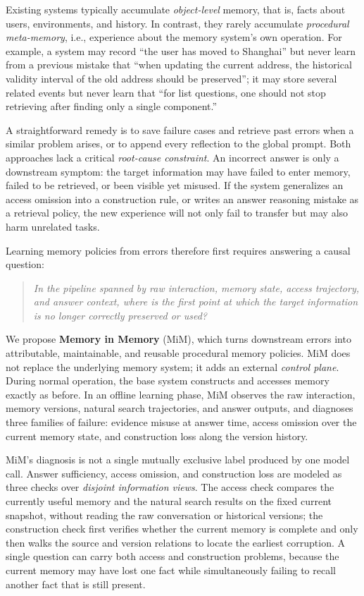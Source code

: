 \documentclass[11pt]{article}
\begin{document}
Existing systems typically accumulate \emph{object-level} memory, that is, facts
about users, environments, and history. In contrast, they rarely accumulate
\emph{procedural meta-memory}, i.e., experience about the memory system's own
operation. For example, a system may record ``the user has moved to Shanghai''
but never learn from a previous mistake that ``when updating the current address,
the historical validity interval of the old address should be preserved''; it
may store several related events but never learn that ``for list questions, one
should not stop retrieving after finding only a single component.''

A straightforward remedy is to save failure cases and retrieve past errors when a
similar problem arises, or to append every reflection to the global prompt.
Both approaches lack a critical \emph{root-cause constraint}. An incorrect answer
is only a downstream symptom: the target information may have failed to enter
memory, failed to be retrieved, or been visible yet misused. If the system
generalizes an access omission into a construction rule, or writes an answer
reasoning mistake as a retrieval policy, the new experience will not only fail to
transfer but may also harm unrelated tasks.

Learning memory policies from errors therefore first requires answering a causal
question:

\begin{quote}
\emph{In the pipeline spanned by raw interaction, memory state, access trajectory,
and answer context, where is the first point at which the target information is
no longer correctly preserved or used?}
\end{quote}

We propose \textbf{Memory in Memory} (MiM), which turns downstream errors into
attributable, maintainable, and reusable procedural memory policies. MiM does not
replace the underlying memory system; it adds an external \emph{control plane}.
During normal operation, the base system constructs and accesses memory exactly
as before. In an offline learning phase, MiM observes the raw interaction, memory
versions, natural search trajectories, and answer outputs, and diagnoses three
families of failure: evidence misuse at answer time, access omission over the
current memory state, and construction loss along the version history.

MiM's diagnosis is not a single mutually exclusive label produced by one model
call. Answer sufficiency, access omission, and construction loss are modeled as
three checks over \emph{disjoint information views}. The access check compares
the currently useful memory and the natural search results on the fixed current
snapshot, without reading the raw conversation or historical versions; the
construction check first verifies whether the current memory is complete and
only then walks the source and version relations to locate the earliest
corruption. A single question can carry both access and construction problems,
because the current memory may have lost one fact while simultaneously failing
to recall another fact that is still present.
\end{document}
